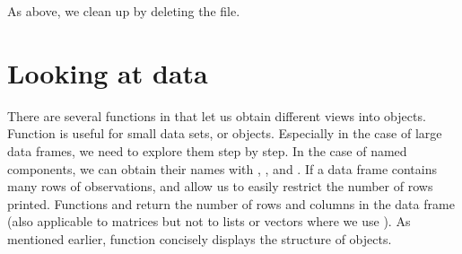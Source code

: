 \documentclass[krantz2]{krantz}\usepackage{knitr}
\begin{document}
As above, we clean up by deleting the file.

\begin{knitrout}\footnotesize
{}\color{fgcolor}\begin{kframe}
\begin{alltt}
\hlstd{(}\hlstd{)}
\end{alltt}
\end{kframe}
\end{knitrout}

\section{Looking at data}\label{sec:calc:looking:at:data}
There are several functions in \Rlang that let us obtain different views into objects. Function  is useful for small data sets, or objects. Especially in the case of large data frames, we need to explore them step by step. In the case of named components, we can obtain their names with , , and . If a data frame contains many rows of observations,  and  allow us to easily restrict the number of rows printed. Functions  and  return the number of rows and columns in the data frame (also applicable to matrices but not to lists or vectors where we use ). As mentioned earlier, function  concisely displays the structure of \Rlang objects.
\end{document}
